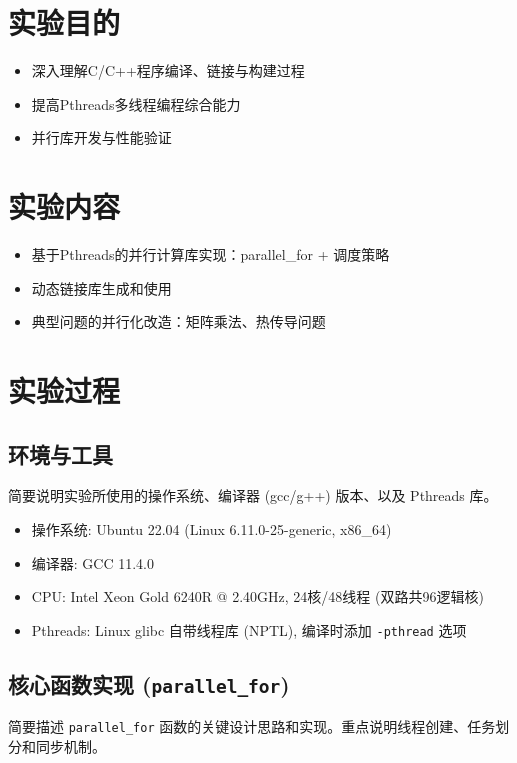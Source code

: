 \documentclass{SYSUReport}
\date{2025年5月18日}
\begin{document}
\cover
\thispagestyle{empty}
\clearpage

\section{实验目的}
\begin{itemize}
  \item 深入理解C/C++程序编译、链接与构建过程
  \item 提高Pthreads多线程编程综合能力
  \item 并行库开发与性能验证
\end{itemize}

\section{实验内容}
\begin{itemize}
  \item 基于Pthreads的并行计算库实现：parallel\_for + 调度策略
  \item 动态链接库生成和使用
  \item 典型问题的并行化改造：矩阵乘法、热传导问题
\end{itemize}

\section{实验过程}

\subsection{环境与工具}
简要说明实验所使用的操作系统、编译器 (gcc/g++) 版本、以及 Pthreads 库。
\begin{itemize}
    \item 操作系统: Ubuntu 22.04 (Linux 6.11.0-25-generic, x86\_64)
    \item 编译器: GCC 11.4.0
    \item CPU: Intel Xeon Gold 6240R @ 2.40GHz, 24核/48线程 (双路共96逻辑核)
    \item Pthreads: Linux glibc 自带线程库 (NPTL), 编译时添加 \texttt{-pthread} 选项
\end{itemize}

\subsection{核心函数实现 (\texttt{parallel\_for})}
简要描述 \texttt{parallel\_for} 函数的关键设计思路和实现。重点说明线程创建、任务划分和同步机制。
\end{document}
